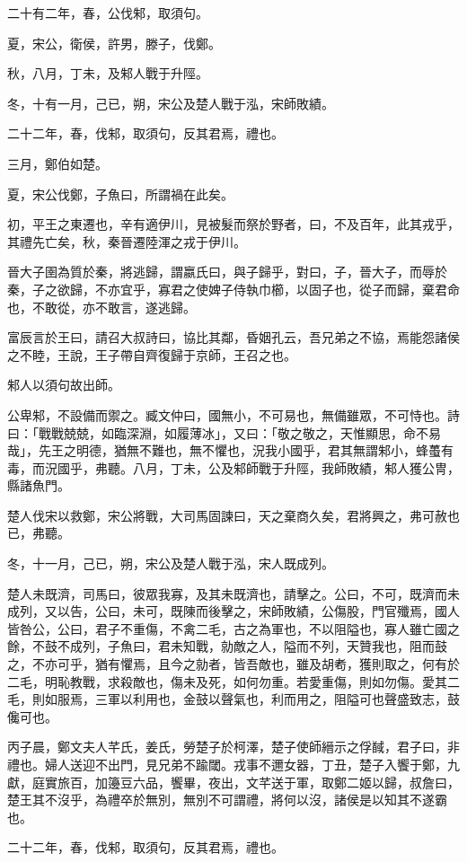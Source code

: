 \begin{pinyinscope}
二十有二年，春，公伐邾，取須句。

夏，宋公，衛侯，許男，滕子，伐鄭。

秋，八月，丁未，及邾人戰于升陘。

冬，十有一月，己已，朔，宋公及楚人戰于泓，宋師敗績。

二十二年，春，伐邾，取須句，反其君焉，禮也。

三月，鄭伯如楚。

夏，宋公伐鄭，子魚曰，所謂禍在此矣。

初，平王之東遷也，辛有適伊川，見被髮而祭於野者，曰，不及百年，此其戎乎，其禮先亡矣，秋，秦晉遷陸渾之戎于伊川。

晉大子圉為質於秦，將逃歸，謂嬴氏曰，與子歸乎，對曰，子，晉大子，而辱於秦，子之欲歸，不亦宜乎，寡君之使婢子侍執巾櫛，以固子也，從子而歸，棄君命也，不敢從，亦不敢言，遂逃歸。

富辰言於王曰，請召大叔詩曰，協比其鄰，昏姻孔云，吾兄弟之不協，焉能怨諸侯之不睦，王說，王子帶自齊復歸于京師，王召之也。

邾人以須句故出師。

公卑邾，不設備而禦之。臧文仲曰，國無小，不可易也，無備雖眾，不可恃也。詩曰：「戰戰兢兢，如臨深淵，如履薄冰」，又曰：「敬之敬之，天惟顯思，命不易哉」，先王之明德，猶無不難也，無不懼也，況我小國乎，君其無謂邾小，蜂蠆有毒，而況國乎，弗聽。八月，丁未，公及邾師戰于升陘，我師敗績，邾人獲公冑，縣諸魚門。

楚人伐宋以救鄭，宋公將戰，大司馬固諫曰，天之棄商久矣，君將興之，弗可赦也已，弗聽。

冬，十一月，己已，朔，宋公及楚人戰于泓，宋人既成列。

楚人未既濟，司馬曰，彼眾我寡，及其未既濟也，請擊之。公曰，不可，既濟而未成列，又以告，公曰，未可，既陳而後擊之，宋師敗績，公傷股，門官殲焉，國人皆咎公，公曰，君子不重傷，不禽二毛，古之為軍也，不以阻隘也，寡人雖亡國之餘，不鼓不成列，子魚曰，君未知戰，勍敵之人，隘而不列，天贊我也，阻而鼓之，不亦可乎，猶有懼焉，且今之勍者，皆吾敵也，雖及胡耇，獲則取之，何有於二毛，明恥教戰，求殺敵也，傷未及死，如何勿重。若愛重傷，則如勿傷。愛其二毛，則如服焉，三軍以利用也，金鼓以聲氣也，利而用之，阻隘可也聲盛致志，鼓儳可也。

丙子晨，鄭文夫人芊氏，姜氏，勞楚子於柯澤，楚子使師縉示之俘馘，君子曰，非禮也。婦人送迎不出門，見兄弟不踰閾。戎事不邇女器，丁丑，楚子入饗于鄭，九獻，庭實旅百，加籩豆六品，饗畢，夜出，文芊送于軍，取鄭二姬以歸，叔詹曰，楚王其不沒乎，為禮卒於無別，無別不可謂禮，將何以沒，諸侯是以知其不遂霸也。

二十二年，春，伐邾，取須句，反其君焉，禮也。


\end{pinyinscope}
